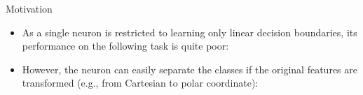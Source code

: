 \begin{vbframe}{Motivation}
\begin{itemize}
\item As a single neuron is restricted to learning only linear decision boundaries, its performance on the following task is quite poor:
\begin{figure}
\centering
{}
\end{figure}
\item However, the neuron can easily separate the classes if the original features are transformed (e.g., from Cartesian to polar coordinate): 
\begin{figure}
\centering
{}
\end{figure}
\end{itemize}
\framebreak


\end{vbframe}
